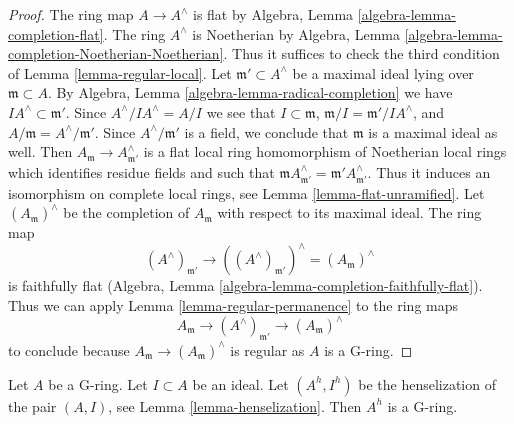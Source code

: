 \begin{proof}
The ring map $A \to A^\wedge$ is flat by
Algebra, Lemma \ref{algebra-lemma-completion-flat}.
The ring $A^\wedge$ is Noetherian by
Algebra, Lemma \ref{algebra-lemma-completion-Noetherian-Noetherian}.
Thus it suffices to check the third condition of
Lemma \ref{lemma-regular-local}.
Let $\mathfrak m' \subset A^\wedge$ be a maximal ideal lying over
$\mathfrak m \subset A$.
By Algebra, Lemma \ref{algebra-lemma-radical-completion}
we have $IA^\wedge \subset \mathfrak m'$.
Since $A^\wedge/IA^\wedge = A/I$ we see that
$I \subset \mathfrak m$, $\mathfrak m/I = \mathfrak m'/IA^\wedge$, and
$A/\mathfrak m = A^\wedge/\mathfrak m'$. Since $A^\wedge/\mathfrak m'$
is a field, we conclude that $\mathfrak m$ is a maximal ideal as well.
Then $A_\mathfrak m \to A^\wedge_{\mathfrak m'}$ is a flat local
ring homomorphism of Noetherian local rings
which identifies residue fields and such that
$\mathfrak m A^\wedge_{\mathfrak m'} = \mathfrak m'A^\wedge_{\mathfrak m'}$.
Thus it induces an isomorphism on complete local rings, see
Lemma \ref{lemma-flat-unramified}.
Let $(A_\mathfrak m)^\wedge$ be the completion of $A_\mathfrak m$
with respect to its maximal ideal.
The ring map
$$
(A^\wedge)_{\mathfrak m'} \to
((A^\wedge)_{\mathfrak m'})^\wedge = (A_\mathfrak m)^\wedge
$$
is faithfully flat (Algebra, Lemma
\ref{algebra-lemma-completion-faithfully-flat}). Thus we can apply
Lemma \ref{lemma-regular-permanence} to the ring maps
$$
A_\mathfrak m \to (A^\wedge)_{\mathfrak m'} \to (A_\mathfrak m)^\wedge
$$
to conclude because $A_\mathfrak m \to (A_\mathfrak m)^\wedge$
is regular as $A$ is a G-ring.
\end{proof}

\begin{lemma}
\label{lemma-henselization-pair-G-ring}
Let $A$ be a G-ring. Let $I \subset A$ be an ideal.
Let $(A^h, I^h)$ be the henselization of the pair $(A, I)$, see
Lemma \ref{lemma-henselization}.
Then $A^h$ is a G-ring.
\end{lemma}

